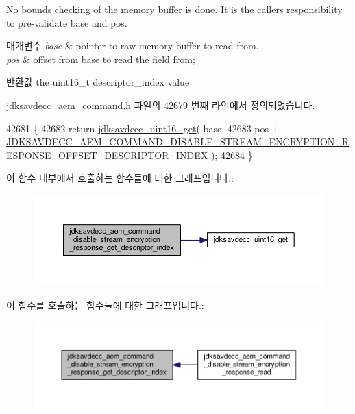 No bounds checking of the memory buffer is done. It is the caller\textquotesingle{}s responsibility to pre-\/validate base and pos.


\begin{DoxyParams}{매개변수}
{\em base} & pointer to raw memory buffer to read from. \\
\hline
{\em pos} & offset from base to read the field from; \\
\hline
\end{DoxyParams}
\begin{DoxyReturn}{반환값}
the uint16\+\_\+t descriptor\+\_\+index value 
\end{DoxyReturn}


jdksavdecc\+\_\+aem\+\_\+command.\+h 파일의 42679 번째 라인에서 정의되었습니다.


\begin{DoxyCode}
42681 \{
42682     \textcolor{keywordflow}{return} \hyperlink{group__endian_ga3fbbbc20be954aa61e039872965b0dc9}{jdksavdecc\_uint16\_get}( base,
42683                                   pos + 
      \hyperlink{group__command__disable__stream__encryption__response_ga722782e98289c186d22189c596971cf2}{JDKSAVDECC\_AEM\_COMMAND\_DISABLE\_STREAM\_ENCRYPTION\_RESPONSE\_OFFSET\_DESCRIPTOR\_INDEX}
       );
42684 \}
\end{DoxyCode}


이 함수 내부에서 호출하는 함수들에 대한 그래프입니다.\+:
\nopagebreak
\begin{figure}[H]
\begin{center}
\leavevmode
\includegraphics[width=350pt]{group__command__disable__stream__encryption__response_ga8f3f8650c4849e321fef206c2d160b56_cgraph}
\end{center}
\end{figure}




이 함수를 호출하는 함수들에 대한 그래프입니다.\+:
\nopagebreak
\begin{figure}[H]
\begin{center}
\leavevmode
\includegraphics[width=350pt]{group__command__disable__stream__encryption__response_ga8f3f8650c4849e321fef206c2d160b56_icgraph}
\end{center}
\end{figure}


